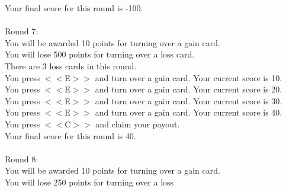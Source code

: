 \documentclass[pdflatex,sn-nature]{sn-jnl}%
\theoremstyle{thmstyleone}%
\theoremstyle{thmstyletwo}%
\theoremstyle{thmstylethree}%
\begin{document}
Your final score for this round is -100. $~$\\ 
 $~$\\ 
Round 7: $~$\\ 
You will be awarded 10 points for turning over a gain card. $~$\\ 
You will lose 500 points for turning over a loss card. $~$\\ 
There are 3 loss cards in this round. $~$\\ 
You press $<<$E$>>$ and turn over a gain card. Your current score is 10. $~$\\ 
You press $<<$E$>>$ and turn over a gain card. Your current score is 20. $~$\\ 
You press $<<$E$>>$ and turn over a gain card. Your current score is 30. $~$\\ 
You press $<<$E$>>$ and turn over a gain card. Your current score is 40. $~$\\ 
You press $<<$C$>>$ and claim your payout. $~$\\ 
Your final score for this round is 40. $~$\\ 
 $~$\\ 
Round 8: $~$\\ 
You will be awarded 10 points for turning over a gain card. $~$\\ 
You will lose 250 points for turning over a loss 
\end{document}
